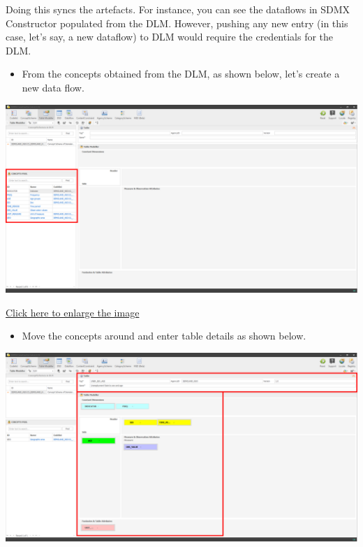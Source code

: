 \documentclass[
]{book}
\providecommand{\tightlist}{%
  \setlength{\itemsep}{0pt}\setlength{\parskip}{0pt}}
\begin{document}
Doing this syncs the artefacts. For instance, you can see the dataflows in SDMX Constructor populated from the DLM. However, pushing any new entry (in this case, let's say, a new dataflow) to DLM would require the credentials for the DLM.

\begin{itemize}
\tightlist
\item
  From the concepts obtained from the DLM, as shown below, let's create a new data flow.
\end{itemize}

\begin{center}\includegraphics[width=1\linewidth]{./images/image218} \end{center}

\href{images/image218.png}{Click here to enlarge the image}

\begin{itemize}
\tightlist
\item
  Move the concepts around and enter table details as shown below.
\end{itemize}

\begin{center}\includegraphics[width=1\linewidth]{./images/image220} \end{center}
\end{document}
